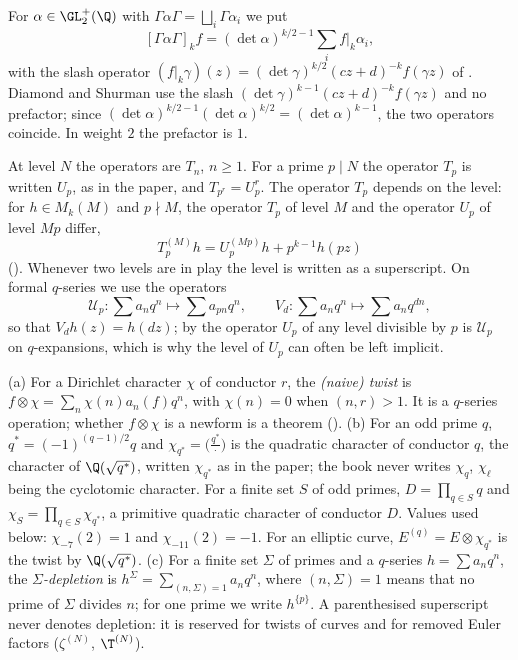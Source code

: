 \begin{convention}\label{conv:hecke:double-coset}
For $\alpha\in\GL_2^+(\Q)$ with $\Gamma\alpha\Gamma=\bigsqcup_i\Gamma\alpha_i$ we put
\[
[\Gamma\alpha\Gamma]_kf=(\det\alpha)^{k/2-1}\sum_if|_k\alpha_i,
\]
with the slash operator $(f|_k\gamma)(z)=(\det\gamma)^{k/2}(cz+d)^{-k}f(\gamma z)$ of . Diamond and Shurman \cite[Section 5.1]{DiamondShurman} use the slash
$(\det\gamma)^{k-1}(cz+d)^{-k}f(\gamma z)$ and no prefactor; since $(\det\alpha)^{k/2-1}(\det\alpha)^{k/2}=(\det\alpha)^{k-1}$, the two operators coincide. In weight $2$ the prefactor
is $1$.
\end{convention}

\begin{convention}\label{conv:hecke:level}
At level $N$ the operators are $T_n$, $n\ge1$. For a prime $p\mid N$ the operator $T_p$ is written $U_p$, as in the paper, and $T_{p^r}=U_p^r$. The operator $T_p$
depends on the level: for $h\in M_k(M)$ and $p\nmid M$, the operator $T_p$ of level $M$ and the operator $U_p$ of level $Mp$ differ,
\[
T_p^{(M)}h=U_p^{(Mp)}h+p^{k-1}h(pz)
\]
(). Whenever two levels are in play the level is written as a superscript. On formal $q$-series we use the operators
\[
\mathcal U_p\colon\sum a_nq^n\mapsto\sum a_{pn}q^n,\qquad V_d\colon\sum a_nq^n\mapsto\sum a_nq^{dn},
\]
so that $V_dh(z)=h(dz)$; by  the operator $U_p$ of any level divisible by $p$ is $\mathcal U_p$ on $q$-expansions, which is why the
level of $U_p$ can often be left implicit.
\end{convention}

\begin{convention}\label{conv:hecke:twists}
(a) For a Dirichlet character $\chi$ of conductor $r$, the \emph{(naive) twist} is $f\otimes\chi=\sum_n\chi(n)a_n(f)q^n$, with $\chi(n)=0$ when $(n,r)>1$. It is a $q$-series operation;
whether $f\otimes\chi$ is a newform is a theorem (). (b) For an odd prime $q$, $q^*=(-1)^{(q-1)/2}q$ and $\chi_{q^*}=\bigl(\frac{q^*}{\cdot}\bigr)$ is the quadratic
character of conductor $q$, the character of $\Q(\sqrt{q^*})$, written $\chi_{q^*}$ as in the paper; the book never writes $\chi_q$, $\chi_\ell$ being the cyclotomic character. For a finite
set $S$ of odd primes, $D=\prod_{q\in S}q$ and $\chi_S=\prod_{q\in S}\chi_{q^*}$, a primitive quadratic character of conductor $D$. Values used below: $\chi_{-7}(2)=1$ and
$\chi_{-11}(2)=-1$. For an elliptic curve, $E^{(q)}=E\otimes\chi_{q^*}$ is the twist by $\Q(\sqrt{q^*})$. (c) For a finite set $\Sigma$ of primes and a $q$-series $h=\sum a_nq^n$,
the \emph{$\Sigma$-depletion} is $h^\Sigma=\sum_{(n,\Sigma)=1}a_nq^n$, where $(n,\Sigma)=1$ means that no prime of $\Sigma$ divides $n$; for one prime we write $h^{\{p\}}$. A parenthesised
superscript never denotes depletion: it is reserved for twists of curves and for removed Euler factors ($\zeta^{(N)}$, $\T^{(N)}$).
\end{convention}

